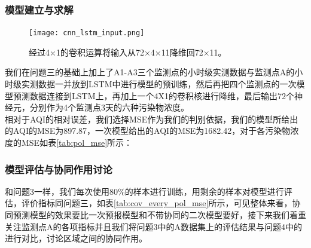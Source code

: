 \documentclass[bwprint]{gmcmthesis}
\numberwithin{figure}{section}
\begin{document}
\subsubsection{模型建立与求解}
\begin{figure}[!h]
	\centering
	\texttt{[image: cnn\_lstm\_input.png]}
	\caption{经过4×1的卷积运算将输入从72×4×11降维回72×11。}
	\label{CNN_LSTM-INPUT}
\end{figure}
我们在问题三的基础上加上了A1-A3三个监测点的小时级实测数据与监测点A的小时级实测数据一并放到LSTM中进行模型的预训练，然后再把四个监测点的一次模型预测数据连接到LSTM上，再加上一个4X1的卷积核进行降维，最后输出72个神经元，分别作为4个监测点3天的六种污染物浓度。\\
相对于AQI的相对误差，我们选择MSE作为我们的判别依据，我们的模型所给出的AQI的MSE为897.87，一次模型给出的AQI的MSE为1682.42，对于各污染物浓度的MSE如表\ref{tab:pol_mse}所示：
\begin{table}
	\caption{各污染物浓度MSE}\label{tab:pol_mse}
	\begin{center}
	\end{center}
\end{table}

\subsubsection{模型评估与协同作用讨论}
和问题3一样，我们每次使用80\%的样本进行训练，用剩余的样本对模型进行评估，评价指标同问题三，如表\ref{tab:cov_every_pol_mse}所示，可见整体来看，协同预测模型的效果要比一次预报模型和不带协同的二次模型要好，接下来我们着重关注监测点A的各项指标并且我们将问题3中的A数据集上的评估结果与问题4中的进行对比，讨论区域之间的协同作用。
\end{document}
